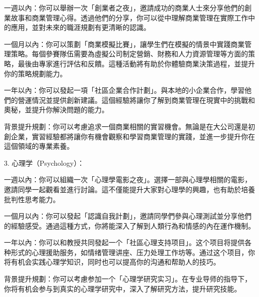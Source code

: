 \documentclass{extarticle}
\begin{document}
\begin{CJK*}{UTF8}{gbsn}
一週以內：你可以舉辦一次「創業者之夜」，邀請成功的商業人士來分享他們的創業故事和商業管理心得。透過他們的分享，你可以從中理解商業管理在實際工作中的應用，並對未來的職涯規劃有更清晰的認識。

一個月以內：你可以策劃「商業模擬比賽」，讓學生們在模擬的情景中實踐商業管理策略。每個參賽隊伍需要為虛擬公司制定營銷、財務和人力資源管理等方面的策略，最後由專家進行評估和反饋。這種活動將有助於你體驗商業決策過程，並提升你的策略規劃能力。

一年以內：你可以發起一項「社區企業合作計劃」。與本地的小企業合作，學習他們的營運情況並提供創新建議。這個經驗將讓你了解到商業管理在現實中的挑戰和奧秘，並提升你解決問題的能力。

背景提升規劃：你可以考慮追求一個商業相關的實習機會。無論是在大公司還是初創企業，實習經驗都將讓你有機會觀察和學習商業管理的實踐，並進一步提升你在這個領域的專業素養。

3. 心理学（Psychology）：

一週以內：你可以組織一次「心理學電影之夜」。選擇一部與心理學相關的電影，邀請同學一起觀看並進行討論。這不僅能提升大家對心理學的興趣，也有助於培養批判性思考能力。

一個月以內：你可以發起「認識自我計劃」，邀請同學們參與心理測試並分享他們的經驗感受。通過這種方式，你將能深入了解到人類行為和情感的內在運作機制。

一年以內：你可以和教授共同發起一个「社區心理支持项目」。这个项目将提供各种形式的心理援助服务，如情绪管理讲座、压力处理工作坊等。通过这个项目，你将有机会实践心理学知识，同时也可以提高你的沟通和帮助人的技巧。

背景提升規劃：你可以考慮参加一个「心理学研究实习」。在专业导师的指导下，你将有机会参与到真实的心理学研究中，深入了解研究方法，提升研究技能。
\printbibliography
\clearpage\end{CJK*}
\end{document}
